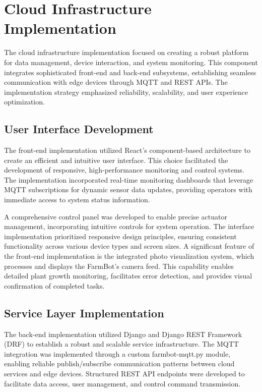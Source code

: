 \section{Cloud Infrastructure Implementation}

The cloud infrastructure implementation focused on creating a robust platform for data management, device interaction, and system monitoring. This component integrates sophisticated front-end and back-end subsystems, establishing seamless communication with edge devices through MQTT and REST APIs. The implementation strategy emphasized reliability, scalability, and user experience optimization.

\subsection{User Interface Development}
The front-end implementation utilized React's component-based architecture to create an efficient and intuitive user interface. This choice facilitated the development of responsive, high-performance monitoring and control systems. The implementation incorporated real-time monitoring dashboards that leverage MQTT subscriptions for dynamic sensor data updates, providing operators with immediate access to system status information.

A comprehensive control panel was developed to enable precise actuator management, incorporating intuitive controls for system operation. The interface implementation prioritized responsive design principles, ensuring consistent functionality across various device types and screen sizes. A significant feature of the front-end implementation is the integrated photo visualization system, which processes and displays the FarmBot's camera feed. This capability enables detailed plant growth monitoring, facilitates error detection, and provides visual confirmation of completed tasks.

\subsection{Service Layer Implementation}
The back-end implementation utilized Django and Django REST Framework (DRF) to establish a robust and scalable service infrastructure. The MQTT integration was implemented through a custom farmbot-mqtt.py module, enabling reliable publish/subscribe communication patterns between cloud services and edge devices. Structured REST API endpoints were developed to facilitate data access, user management, and control command transmission.

